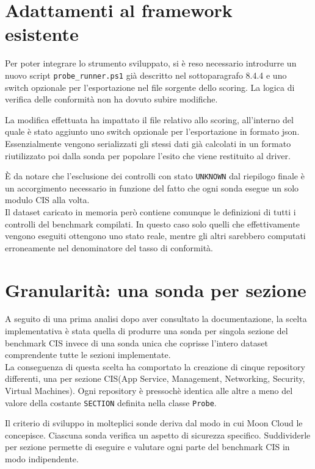 \documentclass[a4paper,11pt]{report}
\begin{document}
\section{Adattamenti al framework esistente}

Per poter integrare lo strumento sviluppato, si è reso necessario introdurre un nuovo script \texttt{probe\_runner.ps1} già descritto nel sottoparagrafo 8.4.4  e uno switch opzionale per l'esportazione nel file sorgente dello scoring.
La logica di verifica delle conformità non ha dovuto subire modifiche.

La modifica effettuata ha impattato il file relativo allo scoring, all'interno del quale è stato aggiunto uno switch opzionale per l'esportazione in formato json. Essenzialmente vengono serializzati gli stessi dati già calcolati in un formato riutilizzato poi dalla sonda per popolare l'esito che viene restituito al driver.

È da notare che l'esclusione dei controlli con stato \texttt{UNKNOWN} dal riepilogo finale è un accorgimento necessario in funzione del fatto che ogni sonda esegue un solo modulo CIS alla volta. \\
Il dataset caricato in memoria però contiene comunque le definizioni di tutti i controlli del benchmark compilati.
In questo caso solo quelli che effettivamente vengono eseguiti ottengono uno stato reale, mentre gli altri sarebbero computati erroneamente nel denominatore del tasso di conformità.


\section{Granularità: una sonda per sezione}

A seguito di una prima analisi dopo aver consultato la documentazione, la scelta implementativa è stata quella di produrre una sonda per singola sezione del benchmark CIS invece di una sonda unica che coprisse l'intero dataset comprendente tutte le sezioni implementate. \\
La conseguenza di questa scelta ha comportato la creazione di cinque repository differenti, una per sezione CIS(App Service, Management, Networking, Security, Virtual Machines).
Ogni repository è pressochè identica alle altre a meno del  valore della costante \texttt{SECTION} definita nella classe \texttt{Probe}.

Il criterio di sviluppo in molteplici sonde deriva dal modo in cui Moon Cloud le concepisce. Ciascuna sonda verifica un aspetto di sicurezza specifico. Suddividerle per sezione permette di eseguire e valutare ogni parte del benchmark CIS in modo indipendente. 
\end{document}
